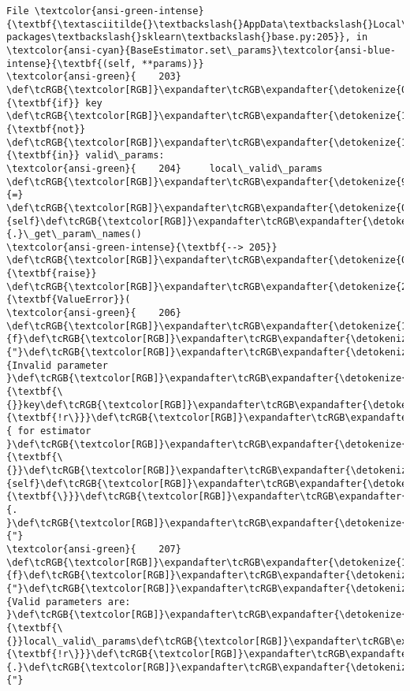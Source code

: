 \documentclass[11pt]{article}
\begin{document}
\begin{Verbatim}[commandchars=\\\{\}, frame=single, framerule=2mm, rulecolor=\color{outerrorbackground}]
File \textcolor{ansi-green-intense}{\textbf{\textasciitilde{}\textbackslash{}AppData\textbackslash{}Local\textbackslash{}anaconda3\textbackslash{}lib\textbackslash{}site-packages\textbackslash{}sklearn\textbackslash{}base.py:205}}, in \textcolor{ansi-cyan}{BaseEstimator.set\_params}\textcolor{ansi-blue-intense}{\textbf{(self, **params)}}
\textcolor{ansi-green}{    203} \def\tcRGB{\textcolor[RGB]}\expandafter\tcRGB\expandafter{\detokenize{0,135,0}}{\textbf{if}} key \def\tcRGB{\textcolor[RGB]}\expandafter\tcRGB\expandafter{\detokenize{175,0,255}}{\textbf{not}} \def\tcRGB{\textcolor[RGB]}\expandafter\tcRGB\expandafter{\detokenize{175,0,255}}{\textbf{in}} valid\_params:
\textcolor{ansi-green}{    204}     local\_valid\_params \def\tcRGB{\textcolor[RGB]}\expandafter\tcRGB\expandafter{\detokenize{98,98,98}}{=} \def\tcRGB{\textcolor[RGB]}\expandafter\tcRGB\expandafter{\detokenize{0,135,0}}{self}\def\tcRGB{\textcolor[RGB]}\expandafter\tcRGB\expandafter{\detokenize{98,98,98}}{.}\_get\_param\_names()
\textcolor{ansi-green-intense}{\textbf{--> 205}}     \def\tcRGB{\textcolor[RGB]}\expandafter\tcRGB\expandafter{\detokenize{0,135,0}}{\textbf{raise}} \def\tcRGB{\textcolor[RGB]}\expandafter\tcRGB\expandafter{\detokenize{215,95,95}}{\textbf{ValueError}}(
\textcolor{ansi-green}{    206}         \def\tcRGB{\textcolor[RGB]}\expandafter\tcRGB\expandafter{\detokenize{175,0,0}}{f}\def\tcRGB{\textcolor[RGB]}\expandafter\tcRGB\expandafter{\detokenize{175,0,0}}{"}\def\tcRGB{\textcolor[RGB]}\expandafter\tcRGB\expandafter{\detokenize{175,0,0}}{Invalid parameter }\def\tcRGB{\textcolor[RGB]}\expandafter\tcRGB\expandafter{\detokenize{175,95,135}}{\textbf{\{}}key\def\tcRGB{\textcolor[RGB]}\expandafter\tcRGB\expandafter{\detokenize{175,95,135}}{\textbf{!r\}}}\def\tcRGB{\textcolor[RGB]}\expandafter\tcRGB\expandafter{\detokenize{175,0,0}}{ for estimator }\def\tcRGB{\textcolor[RGB]}\expandafter\tcRGB\expandafter{\detokenize{175,95,135}}{\textbf{\{}}\def\tcRGB{\textcolor[RGB]}\expandafter\tcRGB\expandafter{\detokenize{0,135,0}}{self}\def\tcRGB{\textcolor[RGB]}\expandafter\tcRGB\expandafter{\detokenize{175,95,135}}{\textbf{\}}}\def\tcRGB{\textcolor[RGB]}\expandafter\tcRGB\expandafter{\detokenize{175,0,0}}{. }\def\tcRGB{\textcolor[RGB]}\expandafter\tcRGB\expandafter{\detokenize{175,0,0}}{"}
\textcolor{ansi-green}{    207}         \def\tcRGB{\textcolor[RGB]}\expandafter\tcRGB\expandafter{\detokenize{175,0,0}}{f}\def\tcRGB{\textcolor[RGB]}\expandafter\tcRGB\expandafter{\detokenize{175,0,0}}{"}\def\tcRGB{\textcolor[RGB]}\expandafter\tcRGB\expandafter{\detokenize{175,0,0}}{Valid parameters are: }\def\tcRGB{\textcolor[RGB]}\expandafter\tcRGB\expandafter{\detokenize{175,95,135}}{\textbf{\{}}local\_valid\_params\def\tcRGB{\textcolor[RGB]}\expandafter\tcRGB\expandafter{\detokenize{175,95,135}}{\textbf{!r\}}}\def\tcRGB{\textcolor[RGB]}\expandafter\tcRGB\expandafter{\detokenize{175,0,0}}{.}\def\tcRGB{\textcolor[RGB]}\expandafter\tcRGB\expandafter{\detokenize{175,0,0}}{"}

\end{Verbatim}
\end{document}
